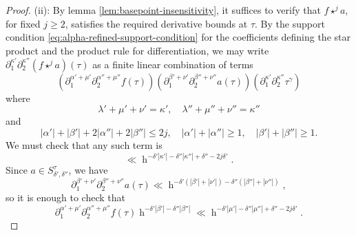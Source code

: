 \documentclass[reqno]{amsart}
\DeclareMathOperator{\h}{h}
\theoremstyle{plain} \newtheorem{theorem} {Theorem}
\theoremstyle{definition} \newtheorem{definition} [theorem] {Definition}
\theoremstyle{itplain} %
\numberwithin{equation}{section}
\numberwithin{theorem}{section}
\renewcommand{\geq}{\geqslant}
\renewcommand{\leq}{\leqslant}
\begin{document}
\begin{proof}
  (ii): By lemma \ref{lem:basepoint-insensitivity}, it suffices to verify that $f \star^j a$, for fixed $j \geq 2$, satisfies the required derivative bounds at $\tau$.  By the support condition \eqref{eq:alpha-refined-support-condition} for the coefficients defining the star product and the product rule for differentiation, we may write $\partial_1^{\kappa '} \partial_2^{\kappa ''} (f \star^j a)(\tau)$ as a finite linear combination of terms
  \[
    \left( \partial_{1}^{\alpha ' + \mu '} \partial_2^{\alpha '' + \mu ''} f(\tau) \right) \left( \partial_{1}^{\beta ' + \nu '} \partial_2^{\beta '' + \nu ''} a(\tau) \right) \left( \partial_1^{\kappa '} \partial_2^{\kappa ''} \tau^{\gamma} \right)
  \]
  where
  \[
    \lambda ' + \mu ' + \nu ' = \kappa ', \quad \lambda '' + \mu '' + \nu '' = \kappa ''
  \]
  and
  \begin{equation}\label{eqn:key-alpha-beta-ineqs}
    |\alpha '| + |\beta '|
    +
    2 |\alpha ''| + 2 |\beta ''|
    \leq 2 j,
    \quad 
    |\alpha '| + |\alpha ''| \geq 1,
    \quad
    |\beta '| + |\beta ''| \geq 1.
  \end{equation}
  We must check that any such term is
  \[
    \ll \h^{- \delta ' |\kappa '| - \delta '' | \kappa ''| + \delta '' - 2 j \delta '}.
  \]
  Since $a \in S^\tau_{\delta ', \delta ''}$, we have
  \begin{equation}\label{eqn:estimates-for-a-for-f-star-a}
    \partial_{1}^{\beta ' + \nu '} \partial_2^{\beta '' + \nu ''} a(\tau)
    \ll
    \h^{- \delta '( |\beta '| +  |\nu '|) - \delta ''(|\beta ''| + |\nu ''|)},
  \end{equation}
  so it is enough to check that
  \begin{equation}\label{eqn:f-star-a-desiderata-f}
    \partial_{1}^{\alpha ' + \mu '} \partial_2^{\alpha '' + \mu ''} f(\tau)
    \h^{ - \delta ' |\beta '|-  \delta ''|\beta ''|}
    \ll
    \h^{- \delta ' |\mu '| - \delta '' | \mu ''| + \delta '' - 2 j \delta '}.    
  \end{equation}


\end{proof}
\end{document}
